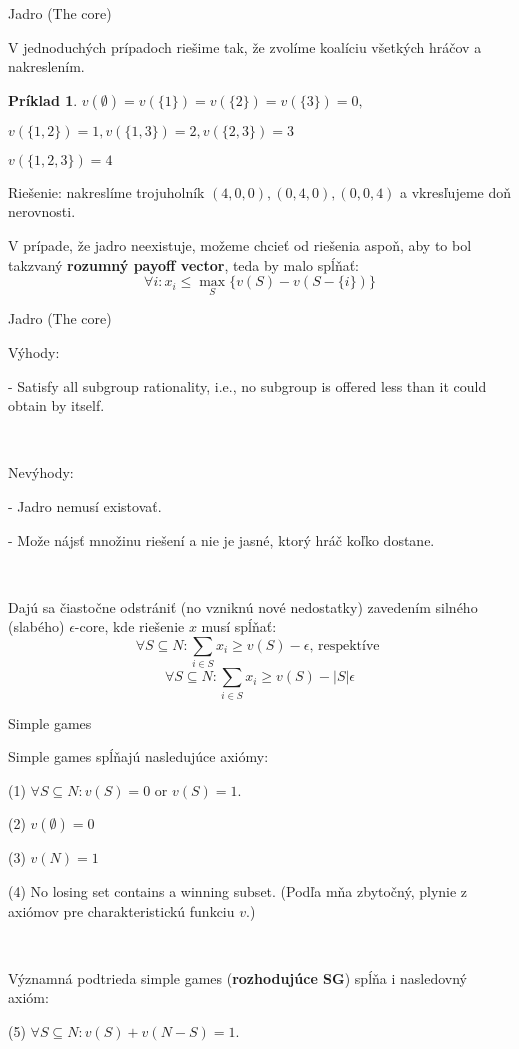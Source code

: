 \documentclass{beamer}
\newtheorem*{exampl}{Pr\'iklad}
\begin{document}
\begin{frame}{Jadro (The core)}

V jednoduch\'ych pr\'ipadoch rie\v{s}ime tak, \v{z}e zvol\'ime koal\'iciu v\v{s}etk\'ych hr\'a\v{c}ov a nakreslen\'im.

\begin{exampl}
$v(\emptyset)= v(\{1\})=v(\{2\})=v(\{3\})=0,$

$v(\{1,2\})= 1, v(\{1,3\})=2, v(\{2,3\})=3$

$v(\{1,2,3\})= 4$

\end{exampl}

Rie\v{s}enie: nakresl\'ime trojuholn\'ik $(4,0,0), (0,4,0), (0,0,4)$ a vkres\v{l}ujeme do\v{n} nerovnosti.

V pr\'ipade, \v{z}e jadro neexistuje, mo\v{z}eme chcie\v{t} od rie\v{s}enia aspo\v{n}, aby to bol takzvan\'y {\bf rozumn\'y payoff vector}, teda by malo sp\'l\v{n}a\v{t}: 
\[ \forall i: x_{i} \leq \max_{S}\{v(S)-v(S-\{i\})\}\]
\end{frame}




\begin{frame}{Jadro (The core)}

V\'yhody: 

- Satisfy all subgroup rationality, i.e., no subgroup is offered less than it could obtain by itself.

\

Nev\'yhody: 

- Jadro nemus\'i existova\v{t}.

- Mo\v{z}e n\'ajs\v{t} mno\v{z}inu rie\v{s}en\'i a nie je jasn\'e, ktor\'y hr\'a\v{c} ko\v{l}ko dostane.

\

Daj\'u sa \v{c}iasto\v{c}ne odstr\'ani\v{t} (no vznikn\'u nov\'e nedostatky) zaveden\'im siln\'eho (slab\'eho) $\epsilon$-core, kde rie\v{s}enie $x$ mus\'i sp\'l\v{n}a\v{t}:
\[\forall S \subseteq N: \sum_{i \in S}x_{i} \geq v(S) - \epsilon  \textrm{, respekt\'ive }\] 
\[\forall S \subseteq N: \sum_{i \in S}x_{i} \geq v(S) - |S|\epsilon \]


\end{frame}



\begin{frame}{Simple games}

Simple games sp\'l\v{n}aj\'u nasleduj\'uce axi\'omy:

(1) $\forall S \subseteq N: v(S)=0$ or $v(S)=1$.

(2) $v(\emptyset)=0$

(3) $v(N)=1$

(4) No losing set contains a winning subset. (Pod\v{l}a m\v{n}a zbyto\v{c}n\'y, plynie z axi\'omov pre charakteristick\'u funkciu $v$.)

\

V\'yznamn\'a podtrieda simple games ({\bf rozhoduj\'uce SG}) sp\'l\v{n}a i nasledovn\'y axi\'om:

(5)  $\forall S \subseteq N: v(S) + v(N - S)= 1$.

\end{frame}
\end{document}
